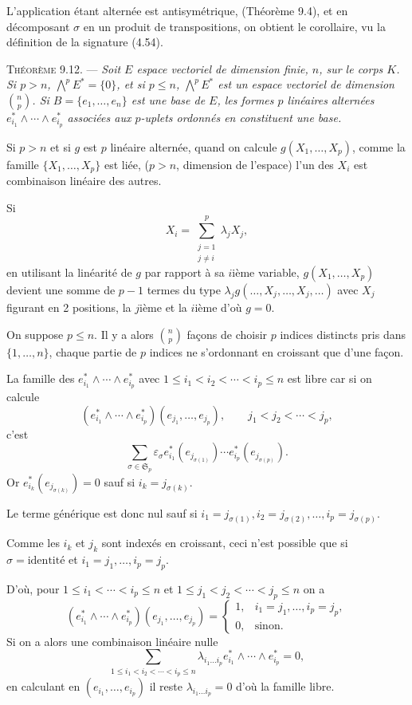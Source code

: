 L'application étant alternée est antisymétrique, (Théorème 9.4), et en décomposant $\sigma$ en un produit de transpositions, on obtient le corollaire, vu la définition de la signature (4.54). \bookend

\medskip\noindent\textsc{Théorème 9.12.} --- \emph{Soit $E$ espace vectoriel de dimension finie, $n$, sur le corps $K$. Si $p>n$, $\bigwedge^pE^*=\{0\}$, et si $p\le n$, $\bigwedge^pE^*$ est un espace vectoriel de dimension $\binom np$. Si $B=\{e_1,\ldots,e_n\}$ est une base de $E$, les formes $p$ linéaires alternées $e_{i_1}^*\wedge\cdots\wedge e_{i_p}^*$ associées aux $p$-uplets ordonnés  en constituent une base.}

Si $p>n$ et si $g$ est $p$ linéaire alternée, quand on calcule $g(X_1,\ldots,X_p)$, comme la famille $\{X_1,\ldots,X_p\}$ est liée, ($p>n$, dimension de l'espace) l'un des $X_i$ est combinaison linéaire des autres.

Si
\[
X_i=\sum_{\substack{j=1\\j\ne i}}^p\lambda_jX_j,
\]
en utilisant la linéarité de $g$ par rapport à sa $i$ième variable, $g(X_1,\ldots,X_p)$ devient une somme de $p-1$ termes du type $\lambda_jg(\ldots,X_j,\ldots,X_j,\ldots)$ avec $X_j$ figurant en 2 positions, la $j$ième et la $i$ième d'où $g=0$.

On suppose $p\le n$. Il y a alors $\binom np$ façons de choisir $p$ indices distincts pris dans $\{1,\ldots,n\}$, chaque partie de $p$ indices ne s'ordonnant en croissant que d'une façon.

La famille des $e_{i_1}^*\wedge\cdots\wedge e_{i_p}^*$ avec $1\le i_1<i_2<\cdots<i_p\le n$ est libre car si on calcule
\[
(e_{i_1}^*\wedge\cdots\wedge e_{i_p}^*)(e_{j_1},\ldots,e_{j_p}),
\qquad j_1<j_2<\cdots<j_p,
\]
c'est
\[
\sum_{\sigma\in\mathfrak S_p}\varepsilon_\sigma e_{i_1}^*(e_{j_{\sigma(1)}})\cdots e_{i_p}^*(e_{j_{\sigma(p)}}).
\]
Or $e_{i_k}^*(e_{j_{\sigma(k)}})=0$ sauf si $i_k=j_{\sigma(k)}$.

Le terme générique est donc nul sauf si $i_1=j_{\sigma(1)},i_2=j_{\sigma(2)},\ldots,i_p=j_{\sigma(p)}$.

Comme les $i_k$ et $j_k$ sont indexés en croissant, ceci n'est possible que si $\sigma=\mathrm{identité}$ et $i_1=j_1,\ldots,i_p=j_p$.

D'où, pour $1\le i_1<\cdots<i_p\le n$ et $1\le j_1<j_2<\cdots<j_p\le n$ on a
\[
(e_{i_1}^*\wedge\cdots\wedge e_{i_p}^*)(e_{j_1},\ldots,e_{j_p})=
\begin{cases}
1,&i_1=j_1,\ldots,i_p=j_p,\\
0,&\text{sinon.}
\end{cases}
\]
Si on a alors une combinaison linéaire nulle
\[
\sum_{1\le i_1<i_2<\cdots<i_p\le n}\lambda_{i_1\ldots i_p}
 e_{i_1}^*\wedge\cdots\wedge e_{i_p}^*=0,
\]
en calculant en $(e_{i_1},\ldots,e_{i_p})$ il reste $\lambda_{i_1\ldots i_p}=0$ d'où la famille libre.

